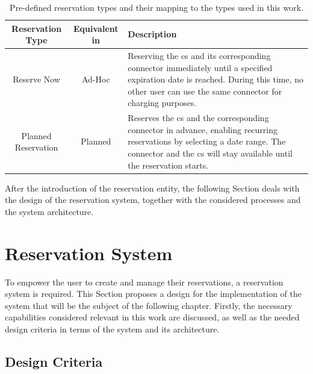 \begingroup
\setlength{\tabcolsep}{10pt} %
\renewcommand{\arraystretch}{1.5} %
\begin{table}[h]
    \centering
    \caption{Pre-defined reservation types and their mapping to the types used in this work.}
    \begin{tabular}{c|c|m{6.5cm}}
        Reservation Type & Equivalent in \cite{basmadjian_interoperable_2019,basmadjian_reference_2020} & Description \\ \hline
        Reserve Now & Ad-Hoc &Reserving the \acrshort{cs} and its corresponding connector immediately until a specified expiration date is reached. During this time, no other user can use the same connector for charging purposes. \\
        Planned Reservation & Planned & Reserves the \acrshort{cs} and the corresponding connector in advance, enabling recurring reservations by selecting a date range. The connector and the \acrshort{cs} will stay available until the reservation starts.
    \end{tabular}
    \label{tab:reservation-types}
\end{table}
\endgroup

\noindent After the introduction of the reservation entity, the following Section deals with the design of the reservation system, together with the considered processes and the system architecture. 

\newpage

\section{Reservation System}
\label{ch:Design:sec:Reservation System}

To empower the user to create and manage their reservations, a reservation system is required. This Section proposes a design for the implementation of the system that will be the subject of the following chapter. Firstly, the necessary capabilities considered relevant in this work are discussed, as well as the needed design criteria in terms of the system and its architecture.

\subsection{Design Criteria}
\label{ch:Design:sec:Reservation System:ssec:Design Criteria}

